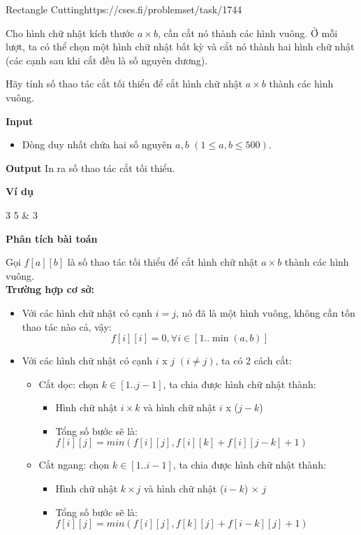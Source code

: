 \begin{baitap}{Rectangle Cutting}{https://cses.fi/problemset/task/1744}

Cho hình chữ nhật kích thước $a \times b$, cần cắt nó thành các hình vuông.  
Ở mỗi lượt, ta có thể chọn một hình chữ nhật bất kỳ và cắt nó thành hai hình chữ nhật (các cạnh sau khi cắt đều là số nguyên dương).  

Hãy tính số thao tác cắt tối thiểu để cắt hình chữ nhật $a \times b$ thành các hình vuông.

\textbf{Input}
\begin{itemize}[noitemsep]
    \item Dòng duy nhất chứa hai số nguyên $a, b$ $(1 \leq a, b \leq 500)$.
\end{itemize}

\textbf{Output}  
In ra số thao tác cắt tối thiểu.

\textbf{Ví dụ}

\begin{sampleio}
3 5 & 3 \\
\end{sampleio}

\end{baitap}

\textbf{Phân tích bài toán}

Gọi $f[a][b]$ là số thao tác tối thiểu để cắt hình chữ nhật $a \times b$ thành các hình vuông. \\

\textbf{Trường hợp cơ sở:}
\begin{itemize}
    \item Với các hình chữ nhật có cạnh $i = j$, nó đã là một hình vuông, không cần tốn thao tác nào cả, vậy: 
    \[
        f[i][i] = 0, \forall i \in [1..\min(a, b)]
    \]
    \item Với các hình chữ nhật có cạnh $i$ x $j$ $(i \neq j)$, ta có 2 cách cắt:
    \begin{itemize}
        \item Cắt dọc: chọn $k \in [1..j - 1]$, ta chia được hình chữ nhật thành:
        \begin{itemize}
            \item Hình chữ nhật $i \times k$ và hình chữ nhật $i$ x ($j - k$)
            \item Tổng số bước sẽ là: $f[i][j] = min(f[i][j], f[i][k] + f[i][j - k] + 1)$
        \end{itemize} 
        \item Cắt ngang: chọn $k \in [1..i - 1]$, ta chia được hình chữ nhật thành:
        \begin{itemize}
            \item Hình chữ nhật $k \times j$ và hình chữ nhật ($i - k$) $\times$ $j$
            \item Tổng số bước sẽ là: $f[i][j] = min(f[i][j], f[k][j] + f[i - k][j] + 1)$
        \end{itemize}
    \end{itemize}
\end{itemize}

